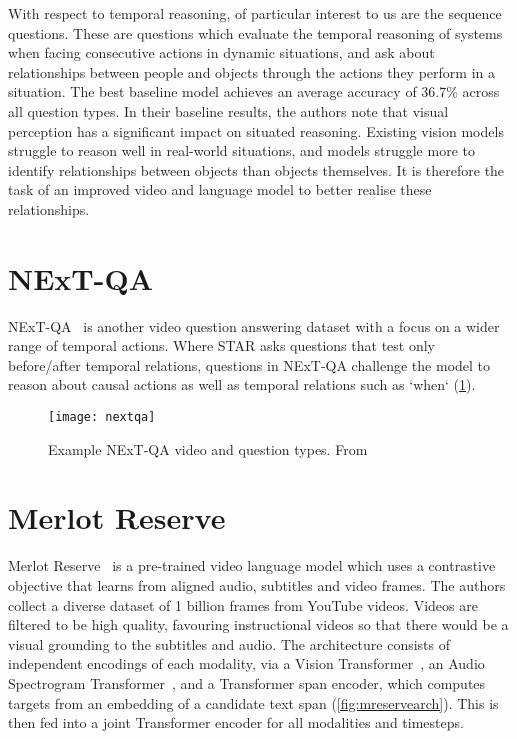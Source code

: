 With respect to temporal reasoning, of particular interest to us are the
sequence questions. These are questions which evaluate the temporal reasoning
of systems when facing consecutive actions in dynamic situations, and ask about
relationships between people and objects through the actions they perform in a
situation. The best baseline model achieves an average accuracy of 36.7\%
across all question types. In their baseline results, the authors note that
visual perception has a significant impact on situated reasoning. Existing
vision models struggle to reason well in real-world situations, and models
struggle more to identify relationships between objects than objects
themselves. It is therefore the task of an improved video and language model to
better realise these relationships.

\section{NExT-QA}

NExT-QA~\citep{xiao2021nextqa} is another video question answering dataset with
a focus on a wider range of temporal actions. Where STAR asks questions that
test only before/after temporal relations, questions in NExT-QA challenge the
model to reason about causal actions as well as temporal relations such as
`when` (\cref{fig:nextqa}).

\begin{figure}[htpb]
	\centering
	\texttt{[image: nextqa]}
	\caption{Example NExT-QA video and question types.
		From~\citet{xiao2021nextqa}}
	\label{fig:nextqa}
\end{figure}

\section{Merlot Reserve}

Merlot Reserve~\citep{zellers2022mreserve} is a pre-trained video language model
which uses a contrastive objective that learns from aligned audio, subtitles
and video frames. The authors collect a diverse dataset of 1 billion frames
from YouTube videos. Videos are filtered to be high quality, favouring
instructional videos so that there would be a visual grounding to the subtitles
and audio. The architecture consists of independent encodings of each modality,
via a Vision Transformer~\citep{dosovitskiy2021vit}, an Audio Spectrogram
Transformer~\citep{gong2021ast}, and a Transformer span encoder, which computes
targets from an embedding of a candidate text span
(\cref{fig:mreservearch}). This is then fed into a joint Transformer encoder
for all modalities and timesteps.


